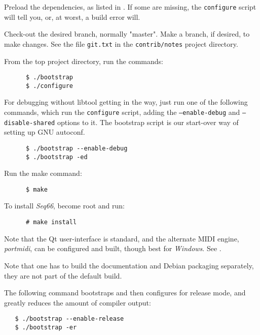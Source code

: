    \begin{enumber}
      \item Preload the dependencies, as listed in
         .
          If some are missing, the
          \texttt{configure} script will tell you,
          or, at worst, a build error will.
      \item Check-out the desired branch, normally "master".
         Make a branch, if desired, to make changes.
         See the file \texttt{git.txt} in the
         \texttt{contrib/notes} project directory.
      \item From the top project directory, run the commands:
\begin{verbatim}
      $ ./bootstrap
      $ ./configure
\end{verbatim}
      \item For debugging without libtool getting in the way, just run
         one of the following commands, which run the
         \texttt{configure} script, adding the
         \texttt{--enable-debug} and
         \texttt{--disable-shared} options to it.
         The bootstrap script is our start-over
         way of setting up GNU autoconf.
\begin{verbatim}
      $ ./bootstrap --enable-debug
      $ ./bootstrap -ed
\end{verbatim}
      \item Run the make command:
\begin{verbatim}
      $ make
\end{verbatim}
      \item To install \textsl{Seq66}, become root and run:
\begin{verbatim}
      # make install
\end{verbatim}
   \end{enumber}

   Note that the Qt user-interface is standard, and the alternate MIDI
   engine, \textsl{portmidi}, can be configured and built, though best for
   \textsl{Windows}.
   See .

   Note that one has to build the documentation and Debian packaging
   separately, they are not part of the default build.

   The following command bootstraps and then configures
   for release mode, and greatly reduces the amount of compiler output:
 
\begin{verbatim}
   $ ./bootstrap --enable-release
   $ ./bootstrap -er
\end{verbatim}

